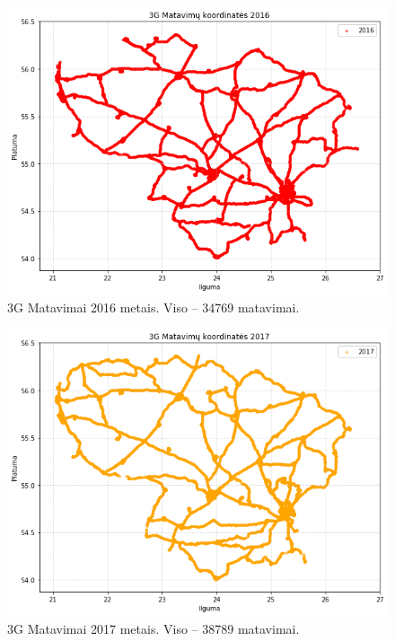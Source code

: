\documentclass{VUMIFPSbakalaurinis}
\begin{document}
\begin{figure}[H]
	\centering
	\includegraphics[scale=0.33]{img/3G-3}
	\caption{3G Matavimai 2016 metais. Viso – 34769 matavimai.}
	\label{img:3G-3}
\end{figure}
\begin{figure}[H]
	\centering
	\includegraphics[scale=0.33]{img/3G-4}
	\caption{3G Matavimai 2017 metais. Viso – 38789 matavimai.}
	\label{img:3G-4}
\end{figure}
\end{document}
